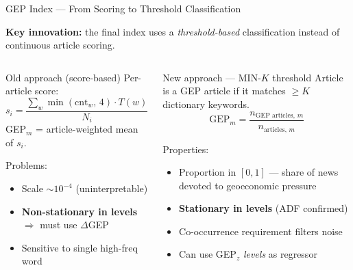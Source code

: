 \documentclass[aspectratio=169]{beamer}
\begin{document}
\begin{frame}{GEP Index — From Scoring to Threshold Classification}

\textbf{Key innovation:} the final index uses a \emph{threshold-based}
classification instead of continuous article scoring.

\medskip
\begin{columns}[T]
\begin{block}{Old approach (score-based)}
\small
Per-article score:
\[
  s_i = \frac{\sum_w \min(\text{cnt}_w,\,4)\cdot T(w)}{N_i}
\]
GEP$_m$ = article-weighted mean of $s_i$.

\smallskip
Problems:
\begin{itemize}
  \item Scale $\sim 10^{-4}$ (uninterpretable)
  \item \textbf{Non-stationary in levels}\\
        $\Rightarrow$ must use $\Delta$GEP
  \item Sensitive to single high-freq word
\end{itemize}
\end{block}

\begin{block}{New approach — MIN-$K$ threshold}
\small
Article is a GEP article if it matches $\geq K$ dictionary keywords.
\[
  \text{GEP}_m = \frac{n_{\text{GEP articles},\,m}}{n_{\text{articles},\,m}}
\]

Properties:
\begin{itemize}
  \item Proportion in $[0,1]$ — share of news devoted to geoeconomic pressure
  \item \textcolor{AccentGreen}{\textbf{Stationary in levels}} (ADF confirmed)
  \item Co-occurrence requirement filters noise
  \item Can use GEP$_z$ \emph{levels} as regressor
\end{itemize}
\end{block}
\end{columns}

\end{frame}
\end{document}
